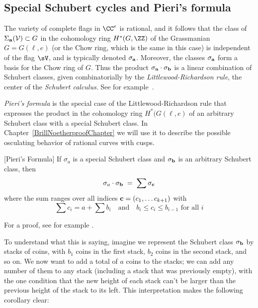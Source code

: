 \subsection{Special Schubert cycles and Pieri's formula}

\begin{fact}
The variety of complete flags in $\CC^e$ is rational, and it follows that the class of $\Sigma_{\bf a}({\cal V})\subset G$
in the cohomology ring $H^*(G, \ZZ)$ of the Grassmanian $G = G(\ell, e)$ (or the Chow ring, which is the same in this case) is independent
of the flag $\sV$, and is typically denoted $\sigma_{\bf a}$. Moreover, the classes $\sigma_{\bf a}$ form a basis for the Chow ring of $G$. Thus the product $\sigma_{\bf a} \cdot \sigma_{\bf b}$ is a linear combination of Schubert classes,
given combinatorially by the \emph{Littlewood-Richardson rule}, the center of the \emph{Schubert calculus}. See for example~\cite{MR2247964}.
\end{fact}

\emph{Pieri's formula} is the special
case of the Littlewood-Richardson rule that expresses the product in the cohomology ring $H^*(G(\ell, e)$ of an arbitrary Schubert class with a special Schubert class.
In Chapter~\ref{BrillNoetherproofChapter} we will use it to describe the possible osculating behavior of rational curves with cusps.

\begin{fact}
\begin{proposition}\label{Pieri}[Pieri's Formula]
If $\sigma_a$ is a special Schubert class and $\sigma_{\bf b}$ is an arbitrary Schubert class, then
$$
\sigma_a \cdot \sigma_{\bf b} \; = \; \sum \sigma_{\bf c}
$$
where the sum ranges over all indices ${\bf c} = (c_1, \dots c_{k+1})$ with
$$
\sum c_i = a + \sum b_i \quad \text{and} \quad b_i \leq c_i \leq b_{i-1} \text{ for all } i
$$
\end{proposition}

For a proof, see for example \cite[Section 4.2.4]{3264}.
\end{fact}
To understand what this is saying, imagine we represent the Schubert class $\sigma_{\bf b}$ by stacks of coins, with $b_1$ coins in the first stack, $b_2$ coins in the second stack, and so on. We now want to add a total of $a$ coins to the stacks; we can add any number of them to any stack (including a stack that was previously empty), with the one condition that the new height of each stack can't be larger than the previous height of the stack to its left. This interpretation makes the following corollary clear:

